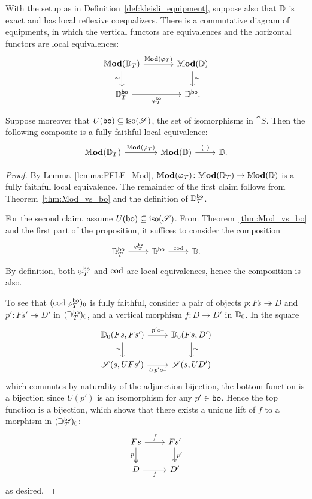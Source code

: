 \documentclass[11pt,oneside,article]{memoir}
\begin{document}
\begin{proposition}
    \label{prop:objectfree_Mod_bo}
  With the setup as in Definition~\ref{def:kleisli_equipment}, suppose also that $\mathbb{D}$ is exact
  and has local reflexive coequalizers. There is a commutative diagram of equipments, in which the vertical
  functors are equivalences and the horizontal functors are local equivalences:
  \[ \begin{tikzcd}[column sep=large]
    \dMod(\dcat{D}_T) \ar[r,"\dMod(\varphi_T)"] \ar[d,"\equiv"']
      & \dMod(\dcat{D}) \ar[d,"\equiv"] \\
    \dcat{D}_T^{\bo} \ar[r,"\varphi_T^{\bo}"'] & \dcat{D}^{\bo}.
  \end{tikzcd} \]

  Suppose moreover that $U(\mathsf{bo})\subseteq\mathrm{iso}(\mathscr{S})$, the set of isomorphisms in
  $\cat{S}$. Then the following composite is a fully faithful local equivalence:
  \[ \begin{tikzcd}
    \dMod(\dcat{D}_T)\ar[r,"\dMod(\varphi_T)"]
      &[1.5em] \dMod(\dcat{D}) \ar[r,"\ColDash"] & \dcat{D}.
  \end{tikzcd} \]
\end{proposition}
\begin{proof}
  By Lemma~\ref{lemma:FFLE_Mod}, $\mathbb{M}\mathbf{od}(\varphi_T)\colon\mathbb{M}\mathbf{od}(\mathbb{D}_T)\to\mathbb{M}\mathbf{od}(\mathbb{D})$ is a
  fully faithful local equivalence. The remainder of the first claim follows from
  Theorem~\ref{thm:Mod_vs_bo} and the definition of $\mathbb{D}_T^{\mathsf{bo}}$.

  For the second claim, assume $U(\mathsf{bo})\subseteq\mathrm{iso}(\mathscr{S})$. From
  Theorem~\ref{thm:Mod_vs_bo} and the first part of the proposition, it suffices to consider the
  composition
  \[ \begin{tikzcd}
    \dcat{D}_T^{\bo} \ar[r,"\varphi_T^{\bo}"]
      & \dcat{D}^{\bo} \ar[r,"\cod"]
      & \dcat{D}.
  \end{tikzcd} \]
  By definition, both $\varphi_T^{\mathsf{bo}}$ and $\operatorname{cod}$ are local equivalences, hence the composition is
  also.

  To see that $(\operatorname{cod}\varphi_T^{\mathsf{bo}})_0$ is fully faithful, consider a pair of objects $p\colon
  Fs\twoheadrightarrow D$ and $p'\colon Fs'\twoheadrightarrow D'$ in $(\mathbb{D}_T^{\mathsf{bo}})_0$, and a
  vertical morphism $f\colon D\to D'$ in $\mathbb{D}_0$. In the square
  \[ \begin{tikzcd}
    \dcat{D}_0(Fs,Fs') \ar[r,"p'\circ\textrm{--}"] \ar[d,"\iso"']
      & \dcat{D}_0(Fs,D') \ar[d,"\iso"] \\
    \cat{S}(s,UFs') \ar[r,"Up'\circ\textrm{--}"']
      & \cat{S}(s,UD')
  \end{tikzcd} \]
  which commutes by naturality of the adjunction bijection, the bottom function is a bijection since
  $U(p')$ is an isomorphism for any $p'\in\mathsf{bo}$. Hence the top function is a bijection, which shows
  that there exists a unique lift of $f$ to a morphism in $(\mathbb{D}_T^{\mathsf{bo}})_0$:
  \[ \begin{tikzcd}
    Fs \ar[r,"\hat{f}"] \ar[d,two heads,"p"']
      & Fs' \ar[d,two heads,"p'"] \\
    D \ar[r,"f"'] & D'
  \end{tikzcd} \]
  as desired.
\end{proof}
\end{document}
